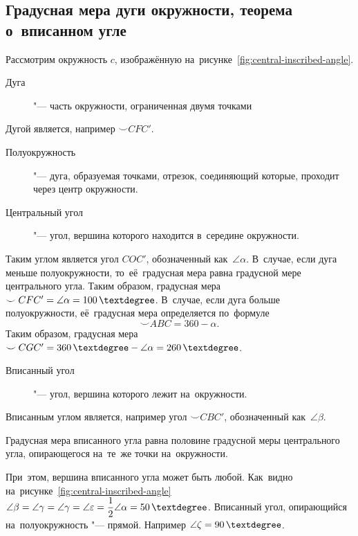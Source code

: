 \documentclass[]{scrartcl}
\begin{document}
\subsection{Градусная мера дуги окружности, теорема о~вписанном угле}
Рассмотрим окружность ${\textstyle c}$, изображённую на~рисунке~\ref{fig:central-inscribed-angle}.
\begin{description}
	\item[Дуга] "--- часть окружности, ограниченная двумя точками
\end{description}
Дугой является, например ${\textstyle \smile CFC'}$.
\begin{description}
	\item[Полуокружность] "--- дуга, образуемая точками, отрезок, соединяющий которые, проходит через центр окружности.
\end{description}
\begin{description}
	\item[Центральный угол] "--- угол, вершина которого находится в~середине окружности.
\end{description}
Таким углом является угол ${\textstyle COC'}$, обозначенный как~${\textstyle \angle \alpha}$. В~случае, если дуга меньше полуокружности, то~её~градусная мера равна градусной мере центрального угла. Таким образом, градусная мера ${\textstyle \smile CFC' = \angle \alpha = 100\,\textdegree}$. В~случае, если дуга больше полуокружности, её~градусная мера определяется по~формуле
\begin{equation}\label{eq:arc-1}
\smile ABC = 360 - \alpha.
\end{equation}
Таким образом, градусная мера ${\textstyle \smile CGC' = 360\,\textdegree - \angle \alpha = 260\,\textdegree}$.
\begin{description}
	\item[Вписанный угол] "--- угол, вершина которого лежит на~окружности.
\end{description}
Вписанным углом является, например угол ${\textstyle \smile CBC'}$, обозначенный как~${\textstyle \angle \beta}$.
\begin{theorem}
	Градусная мера вписанного угла равна половине градусной меры центрального угла, опирающегося на~те~же точки на~окружности.
\end{theorem}
При~этом, вершина вписанного угла может быть любой. Как~видно на~рисунке~\ref{fig:central-inscribed-angle} ${\textstyle \angle \beta = \angle \gamma = \angle \gamma = \angle \varepsilon = \dfrac{1}{2}\angle \alpha = 50\,\textdegree}$. Вписанный угол, опирающийся на~полуокружность "--- прямой. Например ${\textstyle \angle \zeta = 90\,\textdegree}$.
\end{document}
